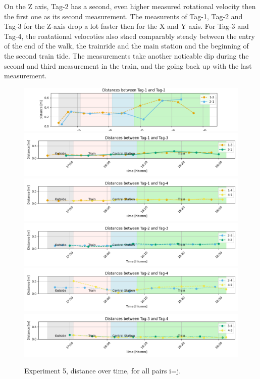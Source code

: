 On the Z axis, Tag-2 has a second, even higher measured rotational velocity then the first one as its second measurement.
The measurents of Tag-1, Tag-2 and Tag-3 for the Z-axis drop a lot faster then for the X and Y axis.
For Tag-3 and Tag-4, the roatational velocoties also staed comparably steady between the entry of the end of the walk, the trainride and the main station and the beginning of the second train tide.
The measurements take another noticable dip during the second and third measurement in the train, and the going back up with the last measurement.


\begin{figure}[ht!]
	\includegraphics[width=\linewidth]{graphics/exp/exp6_dist_data_plot_2_1_2_split.png}
	\includegraphics[width=\linewidth]{graphics/exp/exp6_dist_data_plot_2_1_3_split.png}
	\includegraphics[width=\linewidth]{graphics/exp/exp6_dist_data_plot_2_1_4_split.png}
	\includegraphics[width=\linewidth]{graphics/exp/exp6_dist_data_plot_2_2_3_split.png}
	\includegraphics[width=\linewidth]{graphics/exp/exp6_dist_data_plot_2_2_4_split.png}
	\includegraphics[width=\linewidth]{graphics/exp/exp6_dist_data_plot_2_3_4_split.png}
	\caption{Experiment 5, distance over time, for all pairs i=j.}
	\label{f:exp5_graphs_dist_split}
\end{figure}

